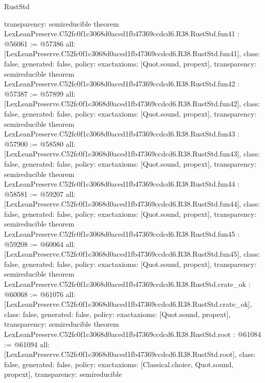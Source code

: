 \begin{lexlean}{RustStd}
\begin{coremodule}
{  transparency: semireducible
}
theorem LexLeanPreserve.C52fc0f1c3068d0aced1fb47369ccdcd6.R38.RustStd.fun41 : @56061 := @57386 {
  all: [LexLeanPreserve.C52fc0f1c3068d0aced1fb47369ccdcd6.R38.RustStd.fun41],
  class: false,
  generated: false,
  policy: exact{axioms: [Quot.sound, propext]},
  transparency: semireducible
}
theorem LexLeanPreserve.C52fc0f1c3068d0aced1fb47369ccdcd6.R38.RustStd.fun42 : @57387 := @57899 {
  all: [LexLeanPreserve.C52fc0f1c3068d0aced1fb47369ccdcd6.R38.RustStd.fun42],
  class: false,
  generated: false,
  policy: exact{axioms: [Quot.sound, propext]},
  transparency: semireducible
}
theorem LexLeanPreserve.C52fc0f1c3068d0aced1fb47369ccdcd6.R38.RustStd.fun43 : @57900 := @58580 {
  all: [LexLeanPreserve.C52fc0f1c3068d0aced1fb47369ccdcd6.R38.RustStd.fun43],
  class: false,
  generated: false,
  policy: exact{axioms: [Quot.sound, propext]},
  transparency: semireducible
}
theorem LexLeanPreserve.C52fc0f1c3068d0aced1fb47369ccdcd6.R38.RustStd.fun44 : @58581 := @59207 {
  all: [LexLeanPreserve.C52fc0f1c3068d0aced1fb47369ccdcd6.R38.RustStd.fun44],
  class: false,
  generated: false,
  policy: exact{axioms: [Quot.sound, propext]},
  transparency: semireducible
}
theorem LexLeanPreserve.C52fc0f1c3068d0aced1fb47369ccdcd6.R38.RustStd.fun45 : @59208 := @60064 {
  all: [LexLeanPreserve.C52fc0f1c3068d0aced1fb47369ccdcd6.R38.RustStd.fun45],
  class: false,
  generated: false,
  policy: exact{axioms: [Quot.sound, propext]},
  transparency: semireducible
}
theorem LexLeanPreserve.C52fc0f1c3068d0aced1fb47369ccdcd6.R38.RustStd.crate_ok : @60068 := @61076 {
  all: [LexLeanPreserve.C52fc0f1c3068d0aced1fb47369ccdcd6.R38.RustStd.crate_ok],
  class: false,
  generated: false,
  policy: exact{axioms: [Quot.sound, propext]},
  transparency: semireducible
}
theorem LexLeanPreserve.C52fc0f1c3068d0aced1fb47369ccdcd6.R38.RustStd.root : @61084 := @61094 {
  all: [LexLeanPreserve.C52fc0f1c3068d0aced1fb47369ccdcd6.R38.RustStd.root],
  class: false,
  generated: false,
  policy: exact{axioms: [Classical.choice, Quot.sound, propext]},
  transparency: semireducible
}


\end{coremodule}
\end{lexlean}
